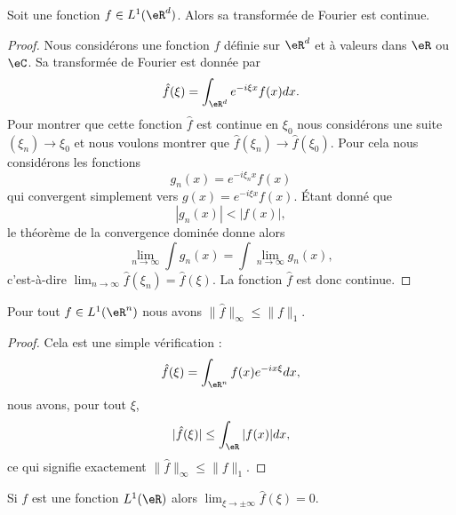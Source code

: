 \begin{proposition}       \label{PropJvNfj}
	Soit une fonction \( f\in L^1(\eR^d)\). Alors sa transformée de Fourier est continue.
\end{proposition}

\begin{proof}
	Nous considérons une fonction \( f\) définie sur \( \eR^d\) et à valeurs dans \( \eR\) ou \( \eC\). Sa transformée de Fourier est donnée par
	\begin{equation}
		\hat f(\xi)=\int_{\eR^d} e^{-i\xi x}f(x)dx.
	\end{equation}
	Pour montrer que cette fonction \( \hat f\) est continue en \( \xi_0\) nous considérons une suite \( (\xi_n)\to \xi_0\) et nous voulons montrer que \( \hat f(\xi_n)\to\hat f(\xi_0)\). Pour cela nous considérons les fonctions
	\begin{equation}
		g_n(x)= e^{-i\xi_nx}f(x)
	\end{equation}
	qui convergent simplement vers \( g(x)= e^{-i\xi x}f(x)\). Étant donné que
	\begin{equation}
		| g_n(x) |<| f(x) |,
	\end{equation}
	le théorème de la convergence dominée donne alors
	\begin{equation}
		\lim_{n\to \infty} \int g_n(x)=\int\lim_{n\to \infty } g_n(x),
	\end{equation}
	c'est-à-dire \( \lim_{n\to \infty} \hat f(\xi_n)=\hat f(\xi)\). La fonction \( \hat f\) est donc continue.
\end{proof}

\begin{lemma}       \label{LEMooCBPTooYlcbrR}
	Pour tout \( f\in L^1(\eR^n)\) nous avons \( \| \hat f \|_{\infty}\leq \| f \|_1\).
\end{lemma}

\begin{proof}
	Cela est une simple vérification :
	\begin{equation}
		\hat f(\xi)=\int_{\eR^n}f(x) e^{-ix\xi}dx,
	\end{equation}
	nous avons, pour tout \( \xi\),
	\begin{equation}
		| \hat f(\xi) |\leq\int_{\eR}| f(x) |dx,
	\end{equation}
	ce qui signifie exactement \( \| \hat f \|_{\infty}\leq \| f \|_1\).
\end{proof}

\begin{lemma}     \label{LesmRLaxXkQV}
	Si \( f\) est une fonction \( L^1(\eR)\) alors \( \lim_{\xi\to\pm\infty} \hat f(\xi)=0\).
\end{lemma}

